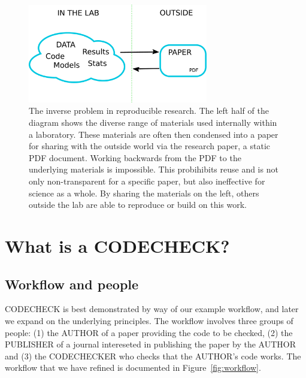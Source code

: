 \documentclass[12pt]{article}
\begin{document}
\begin{figure}
  \centering
  \includegraphics[width=0.7\textwidth]{figs/rr.pdf}
  \caption{The inverse problem in reproducible research.  The left
  half of the diagram shows the diverse range of materials used
  internally within a laboratory.  These materials are often then
  condensed into a paper for sharing with the outside world via the
  research paper, a static PDF document.  Working backwards from the
  PDF to the underlying materials is impossible. This probihibits reuse
  and is not only non-transparent for a specific paper, but also 
  ineffective for science as a whole. By sharing the
  materials on the left, others outside the lab are able to reproduce
  or build on this work.}
  \label{fig:inverse}
\end{figure}

\section*{What is a CODECHECK?}\label{what-is-a-codecheck}

\subsection*{Workflow and people}\label{workflow-people}

CODECHECK is best demonstrated by way of our example workflow, and later
we expand on the underlying principles. The workflow involves three
groups of people: (1) the AUTHOR of a paper providing the code to be checked, (2)
the PUBLISHER of a journal intereseted in publishing the paper by the
AUTHOR and (3) the CODECHECKER who checks that the AUTHOR's code works.
The workflow that we have refined is documented in Figure~\ref{fig:workflow}.

\end{document}
